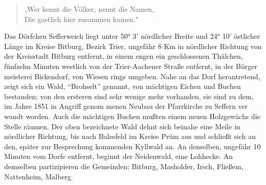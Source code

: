 

\pstart
\trenner


\pend
\begin{verse}
„Wer kennt die Völker, nennt die Namen,\\
Die gastlich hier zusammen kamen."
\end{verse}
\pstart


%
    Das Dörfchen Sefferweich liegt unter 50° 3' nördlicher\ob
Breite und 24° 10'  östlicher Länge im Kreise Bitburg, Bezirk\ob
Trier, ungefähr 8 Km in nördlicher Richtung von der\ob
Kreisstadt Bitburg entfernt, in einem engen ein\ohb
geschlossenen Thälchen, fünfzehn Minuten westlich von\ob
der Trier-Aachener Straße entfernt, in der Bürger\ohb
meisterei Bickendorf, von Wiesen rings umgeben.\ob
Nahe an das Dorf herantretend, zeigt sich ein Wald, \enquote{Brohselt}\ob
{} genannt, von mächtigen Eichen und Buchen bestanden;\ob
von den ersteren sind sehr wenige mehr vorhanden,\ob
{}%
sie sind zu dem, im Jahre 1851 in Angriff genom\ohb
menen Neubau der Pfarrkirche zu Seffern ver\ohb
wandt worden. Auch die mächtigen Buchen mußten\ob
einem neuen Holzgewächs die Stelle räumen. Der\ob
oben bezeichnete Wald dehnt sich beinahe eine Meile\ob
in nördlicher Richtung, bis nach Balesfeld im\ob
Kreise Prüm aus und schließt sich an den,\ob
später zur Besprechung kommenden Kyllwald\ob
an. An denselben, ungefähr 10 Minuten vom Dorfe\ob
{}%
entfernt, beginnt der Neidenwald, eine Lohhecke. An\ob
demselben partizipieren die Gemeinden: Bitburg,\ob
Masholder, Irsch, Fließem, Nattenheim, Malberg
\pend
